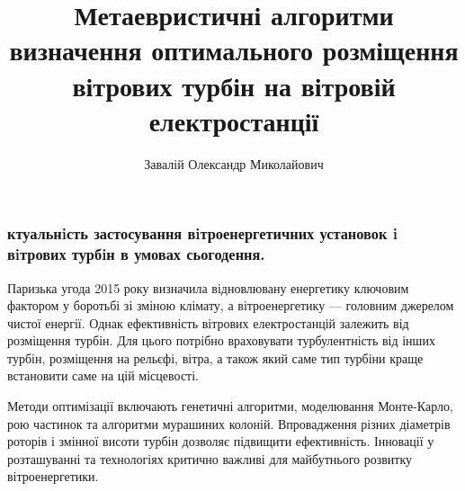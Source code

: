 \documentclass{beamer}
\title{Метаевристичні алгоритми визначення оптимального розміщення вітрових турбін
на вітровій електростанції}
\author{Завалій Олександр Миколайович}
\institute{Науковий керівник: Хайдуров Владислав Володимирович}
\date{}
\begin{document}

    \begin{frame}
        \titlepage
    \end{frame}

    \begin{frame}
        \frametitle{ктуальнiсть застосування вiтроенергетичних установок i вiтрових турбiн в умовах сьогодення.}
        Паризька угода 2015 року визначила відновлювану енергетику ключовим фактором у боротьбі зі зміною клімату, 
        а вітроенергетику — головним джерелом чистої енергії. Однак ефективність вітрових електростанцій залежить від 
        розміщення турбін. Для цього потрібно враховувати турбулентність від інших турбін, розміщення на рельєфі, вітра, а також 
        який саме тип турбіни краще встановити саме на цій місцевості.

        Методи оптимізації включають генетичні алгоритми, моделювання Монте-Карло, рою частинок та алгоритми 
        мурашиних колоній. Впровадження різних діаметрів роторів і змінної висоти турбін дозволяє підвищити ефективність. 
        Інновації у розташуванні та технологіях критично важливі для майбутнього розвитку вітроенергетики.
    \end{frame}
\end{document}
